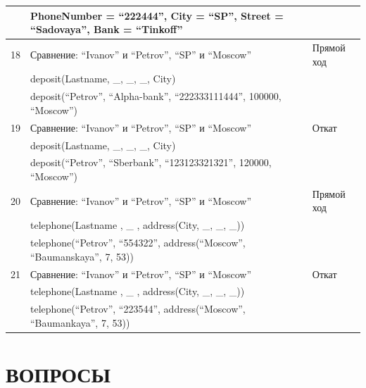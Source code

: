{\begin{longtable}{|p{1.15cm}|p{8cm}|p{8cm}|}
      & \textbf{PhoneNumber = ``222444'', City = ``SP'', Street = ``Sadovaya'', Bank = ``Tinkoff''} & \\
    \hline
    18 & Сравнение: ``Ivanov'' и ``Petrov'', ``SP'' и ``Moscow'' & Прямой ход \\
      & deposit(Lastname, \_, \_, \_, City) & \\
      & deposit(``Petrov'', ``Alpha-bank'', ``222333111444'', 100000, ``Moscow'') & \\
    \hline
    19 & Сравнение: ``Ivanov'' и ``Petrov'', ``SP'' и ``Moscow'' & Откат \\
      & deposit(Lastname, \_, \_, \_, City) & \\
      & deposit(``Petrov'', ``Sberbank'', ``123123321321'', 120000, ``Moscow'') & \\
    \hline
    20 & Сравнение: ``Ivanov'' и ``Petrov'', ``SP'' и ``Moscow'' & Прямой ход \\
      & telephone(Lastname , \_ , address(City, \_, \_, \_)) & \\
      & telephone(``Petrov'', ``554322'', address(``Moscow'', ``Baumanskaya'', 7, 53)) & \\
    \hline
    21 & Сравнение: ``Ivanov'' и ``Petrov'', ``SP'' и ``Moscow'' & Откат \\
      & telephone(Lastname , \_ , address(City, \_, \_, \_)) & \\
      & telephone(``Petrov'', ``223544'', address(``Moscow'', ``Baumankaya'', 7, 53)) & \\
    \hline
\end{longtable}
}

\section{ВОПРОСЫ}

